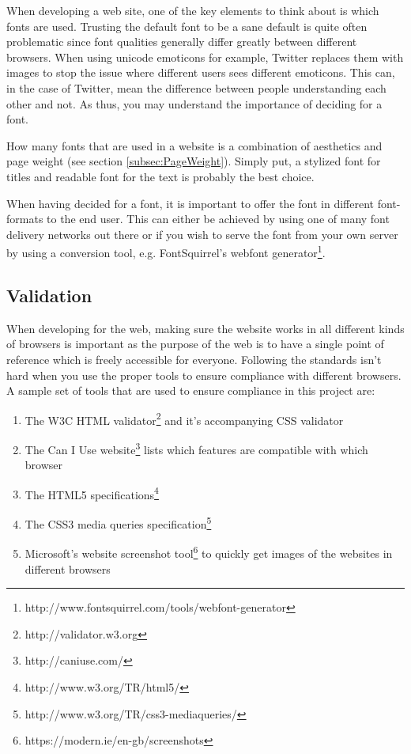 \documentclass[a4paper]{scrartcl}
\begin{document}
When developing a web site, one of the key elements to think about is which fonts are used. Trusting the default font to be a sane default is quite often problematic since font qualities generally differ greatly between different browsers. When using unicode emoticons for example, Twitter replaces them with images to stop the issue where different users sees different emoticons. This can, in the case of Twitter, mean the difference between people understanding each other and not. As thus, you may understand the importance of deciding for a font.

How many fonts that are used in a website is a combination of aesthetics and page weight (see section \ref{subsec:PageWeight}). Simply put, a stylized font for titles and readable font for the text is probably the best choice.

When having decided for a font, it is important to offer the font in different font-formats to the end user. This can either be achieved by using one of many font delivery networks out there or if you wish to serve the font from your own server by using a conversion tool, e.g. FontSquirrel's webfont generator\footnote{http://www.fontsquirrel.com/tools/webfont-generator}.

\subsection{Validation}

When developing for the web, making sure the website works in all different kinds of browsers is important as the purpose of the web is to have a single point of reference which is freely accessible for everyone. Following the standards isn't hard when you use the proper tools to ensure compliance with different browsers. A sample set of tools that are used to ensure compliance in this project are:

\begin{enumerate}
\item The W3C HTML validator\footnote{http://validator.w3.org} and it's accompanying CSS validator
\item The Can I Use website\footnote{http://caniuse.com/} lists which features are compatible with which browser
\item The HTML5 specifications\footnote{http://www.w3.org/TR/html5/}
\item The CSS3 media queries specification\footnote{http://www.w3.org/TR/css3-mediaqueries/}
\item Microsoft's website screenshot tool\footnote{https://modern.ie/en-gb/screenshots} to quickly get images of the websites in different browsers
\end{enumerate}
\end{document}
